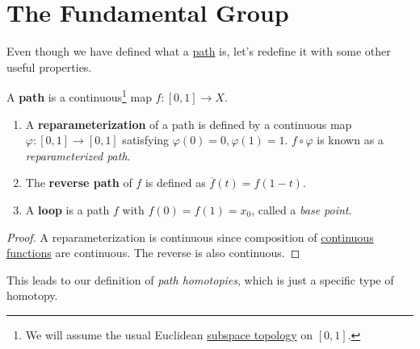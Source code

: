 \section{The Fundamental Group}

	Even though we have defined what a \hyperref[pst-def:path]{path} is, let's redefine it with some other useful properties. 

	\begin{definition}[Path]
	  \label{def:path}
		A \textbf{path} is a continuous\footnote{We will assume the usual Euclidean \hyperref[pst-def:subspace-topology]{subspace topology} on $[0, 1]$.} map $f: [0, 1] \to X$. 
		\begin{enumerate}
			\item A \textbf{reparameterization} of a path is defined by a continuous map $\varphi: [0, 1] \to [0, 1]$ satisfying $\varphi(0) = 0, \varphi(1) = 1$. $f \circ \varphi$ is known as a \textit{reparameterized path}. 
			\item The \textbf{reverse path} of $f$ is defined as $\overline{f} (t) = f(1 - t)$. 
			\item A \textbf{loop} is a path $f$ with $f(0) = f(1) = x_0$, called a \textit{base point}. 
		\end{enumerate}
	\end{definition}
	\begin{proof}
	  A reparameterization is continuous since composition of \hyperref[pst-def:continuous_func]{continuous functions} are continuous. The reverse is also continuous. 
	\end{proof}

  This leads to our definition of \textit{path homotopies}, which is just a specific type of homotopy. 

